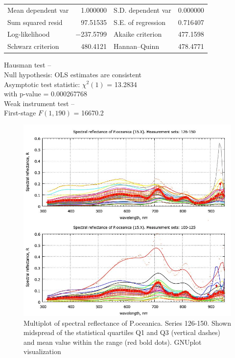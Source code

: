 \documentclass[10pt, a4paper]{article}
\begin{document}
\begin{appendices}
\begin{table}[htbp]
\begin{center}
\vspace{1ex}
\begin{tabular}{lrlr}
Mean dependent var &  1.000000 & S.D. dependent var &  0.000000 \\
Sum squared resid &  97.51535 & S.E. of regression &  0.716407 \\
Log-likelihood & $-$237.5799 & Akaike criterion &  477.1598 \\
Schwarz criterion &  480.4121 & Hannan--Quinn &  478.4771 \\
\end{tabular}

\vspace{1em}
\begin{raggedright}
Hausman test --\\
\quad Null hypothesis: OLS estimates are consistent\\
\quad Asymptotic test statistic: $\chi^2(1)$ = 13.2834\\
\quad with p-value = 0.000267768\\
\vspace{1ex}
Weak instrument test -- \\
\quad First-stage $F(1, 190)$ = 16670.2 \\
\end{raggedright}

\end{center}
\label{tab:14}
\end{table}

\begin{figure}[H]
\begin{center}
\includegraphics[scale=0.4]{GNU-14.jpg}
\caption{Multiplot of spectral reflectance of P.oceanica. Series 126-150. Shown midspread of the statistical quartiles Q1 and Q3 (vertical dashes) and
mean value within the range (red bold dots). GNUplot visualization­}
\label{fig:56}
\end{center}
\end{figure}
\pagebreak


\end{appendices}
\end{document}
